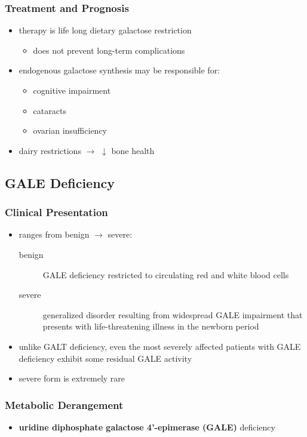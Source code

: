 \documentclass[12pt]{scrartcl}
\begin{document}
\subsubsection{Treatment and Prognosis}
\label{sec:org6b4e363}
\begin{itemize}
\item therapy is life long dietary galactose restriction
\begin{itemize}
\item does not prevent long-term complications
\end{itemize}
\item endogenous galactose synthesis may be responsible for:
\begin{itemize}
\item cognitive impairment
\item cataracts
\item ovarian insufficiency
\end{itemize}
\item dairy restrictions \(\to\) \(\downarrow\) bone health
\end{itemize}

\subsection{GALE Deficiency}
\label{sec:orgc188a58}
\subsubsection{Clinical Presentation}
\label{sec:org54b059d}
\begin{itemize}
\item ranges from benign \(\to\) severe:
\begin{description}
\item[{benign}] GALE deficiency restricted to circulating red and white blood cells
\item[{severe}] generalized disorder resulting from widespread GALE
impairment that presents with life-threatening illness
in the newborn period
\end{description}
\item unlike GALT deficiency, even the most severely affected patients
with GALE deficiency exhibit some residual GALE activity
\item severe form is extremely rare
\end{itemize}

\subsubsection{Metabolic Derangement}
\label{sec:orgecbd2ff}
\begin{itemize}
\item \textbf{uridine diphosphate galactose 4’-epimerase (GALE)} deficiency
\end{itemize}
\end{document}

